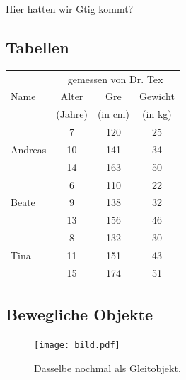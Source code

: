 \documentclass[11pt,a4paper]{article} %
\begin{document}
Hier hatten wir Gtig kommt?

\subsection{Tabellen}
\label{Tabellen}



\begin{center}
\begin{tabular}{|l||c|c|c|}
\hline
           & \multicolumn{3}{|c|}{gemessen von Dr. Tex} \\
\cline{2-4}
Name       &  Alter    & Gre   & Gewicht \\
           &  (Jahre)  & (in cm) & (in kg) \\
\hline
\hline
           &   7       &  120    &  25     \\
\cline{2-4}
Andreas    &   10      &  141    &  34     \\
\cline{2-4}
           &   14      &  163    &  50     \\
\hline
           &   6       &  110    &  22     \\
\cline{2-4}
Beate      &   9       &  138    &  32     \\
\cline{2-4}
           &   13      &  156    &  46     \\
\hline
           &   8       &  132    &  30     \\
\cline{2-4}
Tina       &   11      &  151    &  43     \\
\cline{2-4}
           &   15      &  174    &  51     \\
\hline
\end{tabular}
\end{center}

\subsection{Bewegliche Objekte}
\label{Floats}


\begin{figure}[h]
\begin{center}
\texttt{[image: bild.pdf]}
\caption{Dasselbe nochmal als Gleitobjekt. \label{bild}}
\end{center}
\end{figure}

\end{document}
